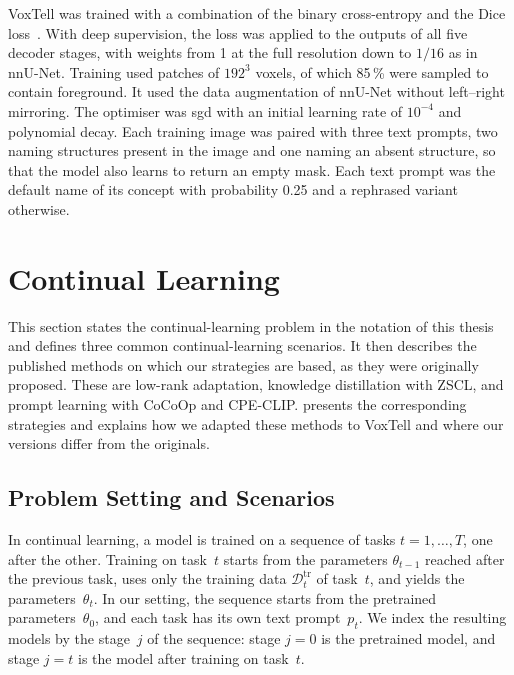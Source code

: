 VoxTell was trained with a combination of the binary cross-entropy and the Dice loss~\cite[Sec.~3, Eq.~7, Suppl.~Sec.~A.3]{rokuss2025voxtellfreetextpromptableuniversal}.
With deep supervision, the loss was applied to the outputs of all five decoder stages, with weights from 1 at the full resolution down to $1/16$ as in nnU-Net.
Training used patches of $192^3$ voxels, of which 85\,\% were sampled to contain foreground.
It used the data augmentation of nnU-Net without left--right mirroring.
The optimiser was \gls{sgd} with an initial learning rate of $10^{-4}$ and polynomial decay.
Each training image was paired with three text prompts, two naming structures present in the image and one naming an absent structure, so that the model also learns to return an empty mask.
Each text prompt was the default name of its concept with probability 0.25 and a rephrased variant otherwise.

\section{Continual Learning}
\label{sec:bg-cl}

This section states the continual-learning problem in the notation of this thesis and defines three common continual-learning scenarios.
It then describes the published methods on which our strategies are based, as they were originally proposed.
These are low-rank adaptation, knowledge distillation with ZSCL, and prompt learning with CoCoOp and CPE-CLIP.
 presents the corresponding strategies and explains how we adapted these methods to VoxTell and where our versions differ from the originals.

\subsection{Problem Setting and Scenarios}
\label{subsec:bg-cl-setting}

In continual learning, a model is trained on a sequence of tasks $t = 1, \dots, T$, one after the other.
Training on task~$t$ starts from the parameters $\theta_{t-1}$ reached after the previous task, uses only the training data $\mathcal{D}_t^{\mathrm{tr}}$ of task~$t$, and yields the parameters~$\theta_t$.
In our setting, the sequence starts from the pretrained parameters~$\theta_0$, and each task has its own text prompt~$p_t$.
We index the resulting models by the stage~$j$ of the sequence: stage $j = 0$ is the pretrained model, and stage $j = t$ is the model after training on task~$t$.

